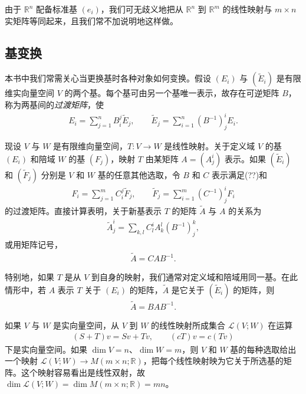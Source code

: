 \documentclass[../../main.tex]{subfiles}
\begin{document}
由于 $\mathbb R^n$ 配备标准基 $(e_i)$，我们可无歧义地把从 $\mathbb R^n$ 到 $\mathbb R^m$ 的线性映射与 $m\times n$ 实矩阵等同起来，且我们常不加说明地这样做。

\subsection*{基变换}

本书中我们常需关心当更换基时各种对象如何变换。假设 $(E_i)$ 与 $(\widetilde E_i)$ 是有限维实向量空间 $V$ 的两个基。每个基可由另一个基唯一表示，故存在可逆矩阵 $B$，称为两基间的\emph{过渡矩阵}，使
\begin{align}\label{align:appB-transition}
E_i=\sum_{j=1}^n B^j_i\widetilde E_j,\qquad
\widetilde E_j=\sum_{i=1}^n (B^{-1})^i_j E_i.
\end{align}

现设 $V$ 与 $W$ 是有限维向量空间，$T:V\to W$ 是线性映射。关于定义域 $V$ 的基 $(E_i)$ 和陪域 $W$ 的基 $(F_j)$，映射 $T$ 由某矩阵 $A=(A^i_j)$ 表示。如果 $(\widetilde E_i)$ 和 $(\widetilde F_j)$ 分别是 $V$ 和 $W$ 基的任意其他选取，令 $B$ 和 $C$ 表示满足(??)和
\begin{align*}
F_i=\sum_{j=1}^m C^j_i\widetilde F_j,\qquad
\widetilde F_j=\sum_{i=1}^m (C^{-1})^i_j F_i
\end{align*}
的过渡矩阵。直接计算表明，关于新基表示 $T$ 的矩阵 $\widetilde A$ 与 $A$ 的关系为
\begin{align*}
\widetilde A^i_j=\sum_{k,l} C^i_l A^l_k (B^{-1})^k_j,
\end{align*}
或用矩阵记号，
\begin{align*}
\widetilde A=CAB^{-1}.
\end{align*}

特别地，如果 $T$ 是从 $V$ 到自身的映射，我们通常对定义域和陪域用同一基。在此情形中，若 $A$ 表示 $T$ 关于 $(E_i)$ 的矩阵，$\widetilde A$ 是它关于 $(\widetilde E_i)$ 的矩阵，则
\begin{align}\label{align:appB-similarity}
\widetilde A=BAB^{-1}.
\end{align}

如果 $V$ 与 $W$ 是实向量空间，从 $V$ 到 $W$ 的线性映射所成集合 $\mathcal L(V;W)$ 在运算
\begin{align*}
(S+T)v=Sv+Tv,\qquad (cT)v=c(Tv)
\end{align*}
下是实向量空间。如果 $\dim V=n$、$\dim W=m$，则 $V$ 和 $W$ 基的每种选取给出一个映射 $\mathcal L(V;W)\to M(m\times n;\mathbb R)$，把每个线性映射映为它关于所选基的矩阵。这个映射容易看出是线性双射，故 $\dim\mathcal L(V;W)=\dim M(m\times n;\mathbb R)=mn$。
\end{document}
